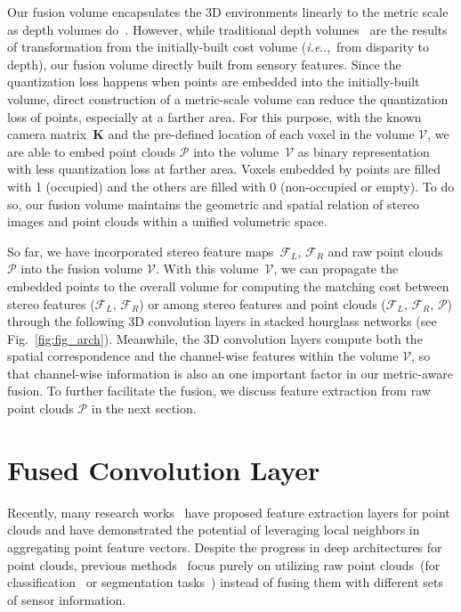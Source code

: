 \documentclass[letterpaper, 10 pt, conference]{ieeeconf}
\makeatletter
\DeclareRobustCommand\onedot{\futurelet\@let@token\@onedot}
\def\@onedot{\ifx\@let@token.\else.\null\fi\xspace}
\def\ie{\emph{i.e}\onedot} \def\Ie{{I.e}\onedot}
\newcommand{\Fref}[1]{Fig.~\textcolor{blue}{\ref{#1}}}
\makeatother
\begin{document}
Our fusion volume encapsulates the 3D environments linearly to the metric scale as depth volumes do~\cite{pseudo_lidar,dsgn}. However, while traditional depth volumes~\cite{pseudo_lidar,dsgn} are the results of transformation from the initially-built cost volume (\ie,~from disparity to depth), our fusion volume directly built from sensory features. Since the quantization loss happens when points are embedded into the initially-built volume, direct construction of a metric-scale volume can reduce the quantization loss of points, especially at a farther area. For this purpose, with the known camera matrix~$\mathbf{K}$ and the pre-defined location of each voxel in the volume $\mathcal{V}$, we are able to embed point clouds $\mathcal{P}$ into the volume~$\mathcal{V}$ as binary representation with less quantization loss at farther area. Voxels embedded by points are filled with 1 (occupied) and the others are filled with 0 (non-occupied or empty). To do so, our fusion volume maintains the geometric and spatial relation of stereo images and point clouds within a unified volumetric space. 


So far, we have incorporated stereo feature maps~$\mathcal{F}_{L}$, $\mathcal{F}_{R}$ and raw point clouds~$\mathcal{P}$ into the fusion volume $\mathcal{V}$. With this volume~$\mathcal{V}$, we can propagate the embedded points to the overall volume for computing the matching cost between stereo features ($\mathcal{F}_{L} \text{, } \mathcal{F}_{R}$) or among stereo features and point clouds ($\mathcal{F}_{L} \text{, } \mathcal{F}_{R} \text{, } \mathcal{P}$) through the following 3D convolution layers in stacked hourglass networks (see \Fref{fig:fig_arch}). Meanwhile, the 3D convolution layers compute both the spatial correspondence and the channel-wise features within the volume $\mathcal{V}$, so that channel-wise information is also an one important factor in our metric-aware fusion. To further facilitate the fusion, we discuss feature extraction from raw point clouds $\mathcal{P}$ in the next section.


\section{Fused Convolution Layer}
\label{sec:Fused Convolution Layer}

Recently, many research works~\cite{pointnet,continuous_conv,point_conv,dynamic_graph_conv,interp_conv} have proposed feature extraction layers for point clouds and have demonstrated the potential of leveraging local neighbors in aggregating point feature vectors. Despite the progress in deep architectures for point clouds, previous methods~\cite{pointnet,continuous_conv,point_conv,dynamic_graph_conv,interp_conv} focus purely on utilizing raw point clouds~(for classification~\cite{dataset-pointclouds-shape-classification} or segmentation tasks~\cite{dataset-pointclouds-indoor-scene-segmentation,dataset-pointclouds-shape-segmentation}) instead of fusing them with different sets of sensor information. 
\end{document}
